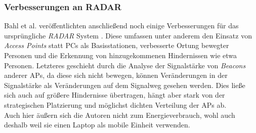 \subsubsection{Verbesserungen an RADAR}
Bahl et al. veröffentlichten anschließend noch einige Verbesserungen für das ursprüngliche \emph{RADAR} System \cite{bahl2000enhancements}.
Diese umfassen unter anderem den Einsatz von \emph{Access Points} statt PCs als Basisstationen, verbesserte Ortung bewegter Personen und die Erkennung von hinzugekommenen Hindernissen wie etwa Personen.
Letzteres geschieht durch die Analyse der Signalstärke von \emph{Beacons} anderer APs, da diese sich nicht bewegen, können Veränderungen in der Signalstärke als Veränderungen auf dem Signalweg gesehen werden.
Dies ließe sich auch auf größere Hindernisse übertragen, hängt aber stark von der strategischen Platzierung und möglichst dichten Verteilung der APs ab.\\
Auch hier äußern sich die Autoren nicht zum Energieverbrauch, wohl auch deshalb weil sie einen Laptop als mobile Einheit verwenden.

